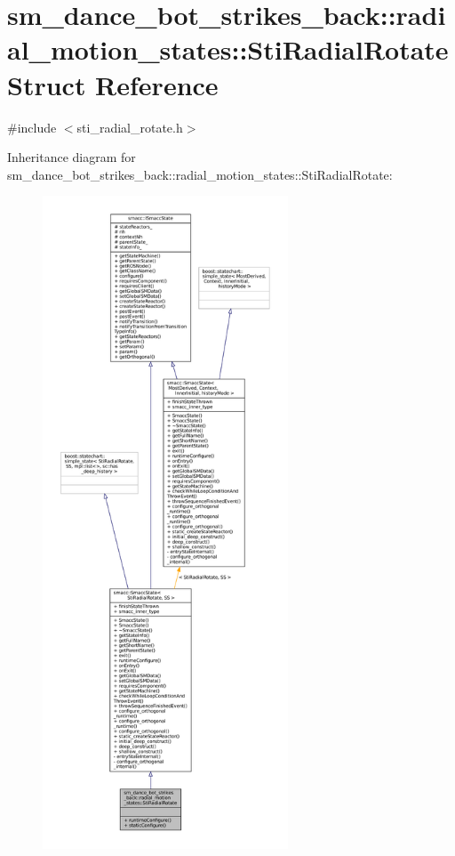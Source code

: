 \hypertarget{structsm__dance__bot__strikes__back_1_1radial__motion__states_1_1StiRadialRotate}{}\section{sm\+\_\+dance\+\_\+bot\+\_\+strikes\+\_\+back\+:\+:radial\+\_\+motion\+\_\+states\+:\+:Sti\+Radial\+Rotate Struct Reference}
\label{structsm__dance__bot__strikes__back_1_1radial__motion__states_1_1StiRadialRotate}


{\ttfamily \#include $<$sti\+\_\+radial\+\_\+rotate.\+h$>$}



Inheritance diagram for sm\+\_\+dance\+\_\+bot\+\_\+strikes\+\_\+back\+:\+:radial\+\_\+motion\+\_\+states\+:\+:Sti\+Radial\+Rotate\+:
\nopagebreak
\begin{figure}[H]
\begin{center}
\leavevmode
\includegraphics[height=550pt]{structsm__dance__bot__strikes__back_1_1radial__motion__states_1_1StiRadialRotate__inherit__graph}
\end{center}
\end{figure}


